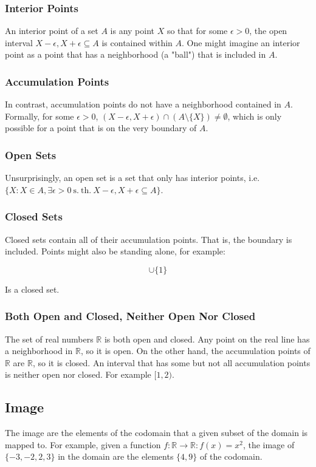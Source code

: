 \subsubsection{Interior Points}
An interior point of a set $A$ is any point $X$ so that for some $\epsilon > 0$, the open interval $X-\epsilon,X+\epsilon \subseteq A$ is contained within $A$. One might imagine an interior point as a point that has a neighborhood (a "ball") that is included in $A$. 

\subsubsection{Accumulation Points} 
In contrast, accumulation points do not have a neighborhood contained in $A$. Formally, for some $\epsilon>0$, $(X-\epsilon,X+\epsilon)\cap (A\setminus \{X\}) \neq \emptyset$, which is only possible for a point that is on the very boundary of $A$.

\subsubsection{Open Sets}
Unsurprisingly, an open set is a set that only has interior points, i.e. $\{X: X\in A, \exists \epsilon > 0 \mathrm{\ s.\ th.\ } X-\epsilon,X+\epsilon \subseteq A  \}$.

\subsubsection{Closed Sets}
Closed sets contain all of their accumulation points. That is, the boundary is included. Points might also be standing alone, for example:

\begin{equation}
[2,4]\cup\{1\}
\end{equation}

Is a closed set.

\subsubsection{Both Open and Closed, Neither Open Nor Closed}
The set of real numbers $\mathbb{R}$ is both open and closed. Any point on the real line has a neighborhood in $\mathbb{R}$, so it is open. On the other hand, the accumulation points of $\mathbb{R}$ are $\mathbb{R}$, so it is closed. An interval that has some but not all accumulation points is neither open nor closed. For example $[1,2)$.	

\subsection{Image}
\label{sec:image}
The image are the elements of the codomain that a given subset of the domain is mapped to. For example, given a function $f:\mathbb{R} \rightarrow \mathbb{R}: f(x) = x^2$, the image of $\{-3,-2,2,3\}$ in the domain are the elements $\{4,9\}$ of the codomain.

